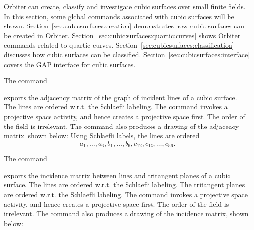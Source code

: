 Orbiter can create, classify and investigate cubic surfaces over small finite fields. 
In this section, some global commands associated with cubic surfaces will be shown. 
Section~\ref{sec:cubicsurfaces:creation} demonstrates how cubic surfaces can be created in Orbiter.
Section~\ref{sec:cubic:surfaces:quartic:curves} shows Orbiter commands related to quartic curves.
Section~\ref{sec:cubicsurfaces:classification} discusses how cubic surfaces can be classified.
Section~\ref{sec:cubicsurfaces:interface} covers the GAP interface for cubic surfaces.

\bigskip

The command 


exports the adjacency matrix of the graph of incident lines of a cubic surface. 
The lines are ordered w.r.t. the Schlaefli labeling.
The command invokes a projective space activity, 
and hence creates a projective space first.
The order of the field is irrelevant. 
The command also produces a drawing of the adjacency matrix, shown below:
Using Schlaefli labels, the lines are ordered 
$$
a_1,\ldots,a_6,b_1,\ldots,b_6,c_{12},c_{13}, \ldots, c_{56}.
$$

\bigskip


The command 


exports the incidence matrix between lines and tritangent planes of a cubic surface. 
The lines are ordered w.r.t. the Schlaefli labeling.
The tritangent planes are ordered w.r.t. the Schlaefli labeling.
The command invokes a projective space activity, 
and hence creates a projective space first.
The order of the field is irrelevant. 
The command also produces a drawing of the incidence matrix, shown below:

\bigskip



